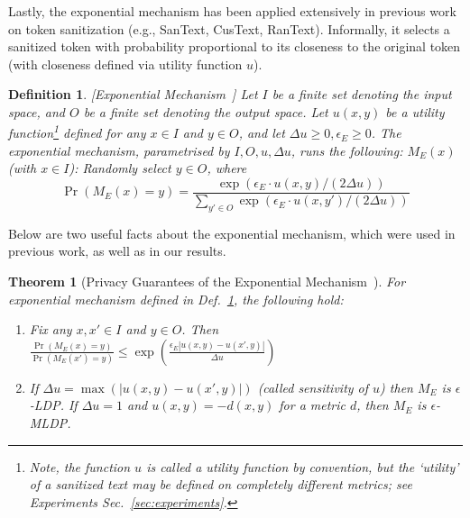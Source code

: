 \documentclass[11pt]{article}
\newtheorem{definition}{Definition}
\newtheorem{theorem}{Theorem}
\begin{document}
Lastly, the exponential mechanism has been applied extensively in previous work on token sanitization (e.g., SanText, CusText, RanText). Informally, it selects a sanitized token with probability proportional to its closeness to the original token (with closeness defined via utility function $u$).
\begin{definition}
\label{def:expmech}
[Exponential Mechanism~\cite{mcsherry2007mechanism}]
    Let $I$ be a finite set denoting the input space, and $O$ be a finite set denoting the output space. 
    Let $u(x, y)$ be a utility function\footnote{Note, the function $u$ is called a {\em utility function} by convention, but the `utility' of a sanitized text may be defined on completely different metrics; see Experiments Sec.~\ref{sec:experiments}.} defined for any $x\in I$ and $y\in O$, and let $\Delta u \geq 0, \epsilon_E\geq 0$. The exponential mechanism, parametrised by $I, O, u, \Delta u$, runs the following: 
    $M_E(x)$ (with $x\in I$):
        Randomly select $y\in O$, where
        {\small $$\Pr(M_E(x) = y) = \frac{ \exp(\epsilon_E\cdot u(x, y)/(2\Delta u))}{\sum_{y'\in O}\exp(\epsilon_E\cdot u(x, y')/(2\Delta u))}
        $$}
\end{definition}

Below are two useful facts about the exponential mechanism, which were used in previous work, as well as in our results.  
\begin{theorem}[Privacy Guarantees of the Exponential Mechanism~\cite{mcsherry2007mechanism,yue2021differential}]\label{thm:exp_mech_privacy}
    For exponential mechanism defined in Def.~\ref{def:expmech}, the following hold:
    \begin{enumerate}
    \setlength\itemsep{0em}

        \item Fix any $x, x' \in I$ and $y\in O$. Then 
        $
            \frac{\Pr(M_E(x) = y)}{\Pr(M_E(x') = y)} \leq \exp\left(\frac{\epsilon_E |u(x, y) - u(x', y)|}{\Delta u}\right)
        $
        \item If $\Delta u = \max\left(|u(x, y) - u(x', y)| \right)$ (called {\em sensitivity} of $u$) then $M_E$ is $\epsilon$-LDP. If $\Delta u = 1$ and $u(x,y) = -d(x,y)$ for a metric $d$, then $M_E$ is $\epsilon$-MLDP.
    \end{enumerate}
\end{theorem}
\end{document}
